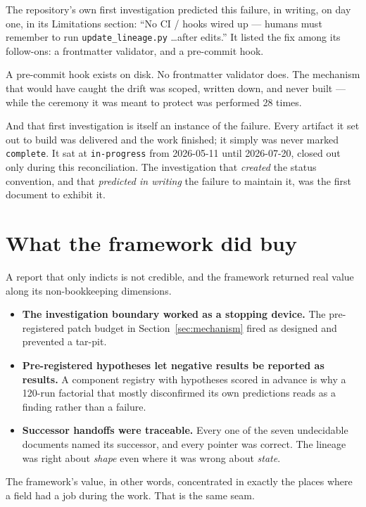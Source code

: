\documentclass[11pt]{article}
\begin{document}
The repository's own first investigation predicted this failure, in writing,
on day one, in its Limitations section: ``No CI / hooks wired up --- humans
must remember to run \texttt{update\_lineage.py} \ldots after edits.'' It
listed the fix among its follow-ons: a frontmatter validator, and a
pre-commit hook.

A pre-commit hook exists on disk. No frontmatter validator does. The
mechanism that would have caught the drift was scoped, written down, and
never built --- while the ceremony it was meant to protect was performed 28
times.

And that first investigation is itself an instance of the failure. Every
artifact it set out to build was delivered and the work finished; it simply
was never marked \texttt{complete}. It sat at \texttt{in-progress} from
2026-05-11 until 2026-07-20, closed out only during this reconciliation. The
investigation that \emph{created} the status convention, and that
\emph{predicted in writing} the failure to maintain it, was the first
document to exhibit it.

\section{What the framework did buy}
\label{sec:bought}

A report that only indicts is not credible, and the framework returned real
value along its non-bookkeeping dimensions.

\begin{itemize}[topsep=3pt,itemsep=1pt]
  \item \textbf{The investigation boundary worked as a stopping device.} The
        pre-registered patch budget in Section~\ref{sec:mechanism} fired as
        designed and prevented a tar-pit.
  \item \textbf{Pre-registered hypotheses let negative results be reported
        as results.} A component registry with hypotheses scored in advance
        is why a 120-run factorial that mostly disconfirmed its own
        predictions reads as a finding rather than a failure.
  \item \textbf{Successor handoffs were traceable.} Every one of the seven
        undecidable documents named its successor, and every pointer was
        correct. The lineage was right about \emph{shape} even where it was
        wrong about \emph{state}.
\end{itemize}

\noindent
The framework's value, in other words, concentrated in exactly the places
where a field had a job during the work. That is the same seam.
\end{document}
